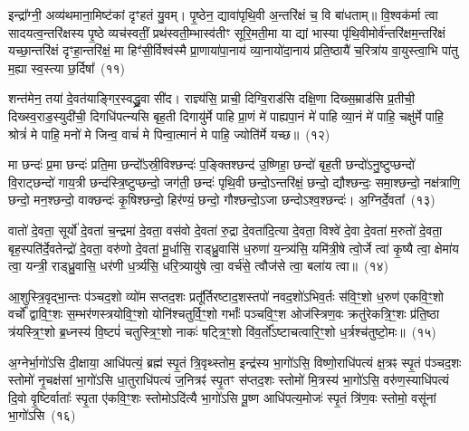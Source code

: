 {\anuvakamend[{पुरु॑षो॒ वयः॒ षड्विꣳ॑शतिश्च}]}%

इन्द्रा᳚ग्नी॒ अव्य॑थमाना॒मिष्ट॑कां दृꣳहतं यु॒वम्। पृ॒ष्ठेन॒ द्यावा॑पृथि॒वी अ॒न्तरि॑क्षं च॒ वि बा॑धताम्॥ वि॒श्वक॑र्मा त्वा सादयत्व॒न्तरि॑क्षस्य पृ॒ष्ठे व्यच॑स्वतीं॒ प्रथ॑स्वती॒म्भास्व॑तीꣳ सूरि॒मती॒मा या द्यां भास्या पृ॑थि॒वीमोर्व॑न्तरि॑क्षम॒न्तरि॑क्षं यच्छा॒न्तरि॑क्षं दृꣳहा॒न्तरि॑क्षं॒ मा हिꣳ॑सी॒र्विश्व॑स्मै प्रा॒णाया॑पा॒नाय॑ व्या॒नायो॑दा॒नाय॑ प्रति॒ष्ठायै॑ च॒रित्रा॑य वा॒युस्त्वा॒भि पा॑तु म॒ह्या स्व॒स्त्या छ॒र्दिषा᳚~(११)

शन्त॑मेन॒ तया॑ दे॒वत॑याङ्गिर॒स्वद्ध्रु॒वा सी॑द। राज्ञ्य॑सि॒ प्राची॒ दिग्वि॒राड॑सि दक्षि॒णा दिख्स॒म्राड॑सि प्र॒तीची॒ दिख्स्व॒राड॒स्युदी॑ची॒ दिगधि॑पत्न्यसि बृह॒ती दिगायु॑र्मे पाहि प्रा॒णं मे॑ पाह्यपा॒नं मे॑ पाहि व्या॒नं मे॑ पाहि॒ चक्षु॑र्मे पाहि॒ श्रोत्रं॑ मे पाहि॒ मनो॑ मे जिन्व॒ वाचं॑ मे पिन्वा॒त्मानं॑ मे पाहि॒ ज्योति॑र्मे यच्छ॥~(१२)

{\anuvakamend[{छ॒र्दिषा॑ पिन्व॒ षट्च॑}]}%

मा छन्दः॑ प्र॒मा छन्दः॑ प्रति॒मा छन्दो᳚\-ऽस्री॒विश्छन्दः॑ प॒ङ्क्तिश्छन्द॑ उ॒ष्णिहा॒ छन्दो॑ बृह॒ती छन्दो॑\-ऽनु॒ष्टुप्छन्दो॑ वि॒राट्छन्दो॑ गाय॒त्री छन्द॑स्त्रि॒ष्टुप्छन्दो॒ जग॑ती॒ छन्दः॑ पृथि॒वी छन्दो॒\-ऽन्तरि॑क्षं॒ छन्दो॒ द्यौश्छन्दः॒ समा॒श्छन्दो॒ नक्ष॑त्राणि॒ छन्दो॒ मन॒श्छन्दो॒ वाक्छन्दः॑ कृ॒षिश्छन्दो॒ हिर॑ण्यं॒ छन्दो॒ गौश्छन्दो॒\-ऽजा छन्दो\-ऽश्व॒श्छन्दः॑। अ॒ग्निर्दे॒वता᳚~(१३)

वातो॑ दे॒वता॒ सूर्यो॑ दे॒वता॑ च॒न्द्रमा॑ दे॒वता॒ वस॑वो दे॒वता॑ रु॒द्रा दे॒वता॑दि॒त्या दे॒वता॒ विश्वे॑ दे॒वा दे॒वता॑ म॒रुतो॑ दे॒वता॒ बृह॒स्पति॑र्दे॒वतेन्द्रो॑ दे॒वता॒ वरु॑णो दे॒वता॑ मू॒र्धासि॒ राड्ध्रु॒वासि॑ ध॒रुणा॑ य॒न्त्र्य॑सि॒ यमि॑त्री॒षे त्वो॒र्जे त्वा॑ कृ॒ष्यै त्वा॒ क्षेमा॑य त्वा॒ यन्त्री॒ राड्ध्रु॒वासि॒ धर॑णी ध॒र्त्र्य॑सि॒ धरि॒त्र्यायु॑षे त्वा॒ वर्च॑से॒ त्वौज॑से त्वा॒ बला॑य त्वा॥~(१४)

{\anuvakamend[{दे॒वता\-ऽ\-ऽयु॑षे त्वा॒ षट्च॑}]}%

आ॒शुस्त्रि॒वृद्भा॒न्तः प॑ञ्चद॒शो व्यो॑म सप्तद॒शः प्रतू᳚र्तिरष्टाद॒शस्तपो॑ नवद॒शो॑\-ऽभिव॒र्तः स॑वि॒ꣳ॒शो ध॒रुण॑ एकवि॒ꣳ॒शो वर्चो᳚ द्वावि॒ꣳ॒शः स॒म्भर॑णस्त्रयोवि॒ꣳ॒शो योनि॑श्चतुर्वि॒ꣳ॒शो गर्भाः᳚ पञ्चवि॒ꣳ॒श ओज॑स्त्रिण॒वः क्रतु॑रेकत्रि॒ꣳ॒शः प्र॑ति॒ष्ठा त्र॑यस्त्रि॒ꣳ॒शो ब्र॒ध्नस्य॑ वि॒ष्टपं॑ चतुस्त्रि॒ꣳ॒शो नाकः॑ षट्त्रि॒ꣳ॒शो वि॑व॒र्तो᳚\-ऽष्टाचत्वारि॒ꣳ॒शो ध॒र्त्रश्च॑तुष्टो॒मः॥~(१५)

{\anuvakamend[{आ॒शुः स॒प्तत्रिꣳ॑शत्}]}%

अ॒ग्नेर्भा॒गो॑\-ऽसि दी॒क्षाया॒ आधि॑पत्यं॒ ब्रह्म॑ स्पृ॒तं त्रि॒वृथ्स्तोम॒ इन्द्र॑स्य भा॒गो॑\-ऽसि॒ विष्णो॒राधि॑पत्यं क्ष॒त्रꣴ स्पृ॒तं प॑ञ्चद॒शः स्तोमो॑ नृ॒चक्ष॑सां भा॒गो॑\-ऽसि धा॒तुराधि॑पत्यं ज॒नित्रꣴ॑ स्पृ॒तꣳ स॑प्तद॒शः स्तोमो॑ मि॒त्रस्य॑ भा॒गो॑\-ऽसि॒ वरु॑ण॒स्याधि॑पत्यं दि॒वो वृ॒ष्टिर्वाताः᳚ स्पृ॒ता ए॑कवि॒ꣳ॒शः स्तोमो\-ऽदि॑त्यै भा॒गो॑\-ऽसि पू॒ष्ण आधि॑पत्य॒मोजः॑ स्पृ॒तं त्रि॑ण॒वः स्तोमो॒ वसू॑नां भा॒गो॑\-ऽसि~(१६)

